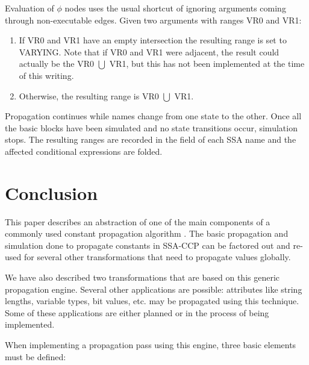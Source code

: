 Evaluation of $\phi$ nodes uses the usual shortcut of ignoring
arguments coming through non-executable edges.  Given two
arguments with ranges VR0 and VR1:

\begin{enumerate}
\item	If VR0 and VR1 have an empty intersection the resulting
	range is set to VARYING.  Note that if VR0 and VR1
	were adjacent, the result could actually be the VR0
	$\bigcup$ VR1, but this has not been implemented at the
	time of this writing.

\item	Otherwise, the resulting range is VR0 $\bigcup$ VR1.
\end{enumerate}

Propagation continues while names change from one state to the
other.  Once all the basic blocks have been simulated and no
state transitions occur, simulation stops.  The resulting ranges
are recorded in the  field of each
SSA name and the affected conditional expressions are folded.

\section{Conclusion}
\label{novillo:sec:conclusion}

This paper describes an abstraction of one of the main components
of a commonly used constant propagation algorithm
\cite{bib:wegman.ea-91}.  The basic propagation and simulation
done to propagate constants in SSA-CCP can be factored out and
re-used for several other transformations that need to propagate
values globally.

We have also described two transformations that are based on this
generic propagation engine.  Several other applications are
possible: attributes like string lengths, variable types, bit
values, etc. may be propagated using this technique.  Some of
these applications are either planned or in the process of being
implemented.  

When implementing a propagation pass using this engine, three
basic elements must be defined:

